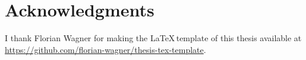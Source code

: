 \chapter*{Acknowledgments}
\setlength{\parskip}{0.68em} 
\setlength{\parindent}{0em}


I thank Florian Wagner for making the \LaTeX\,template of this thesis available at \url{https://github.com/florian-wagner/thesis-tex-template}.
\setlength{\parindent}{0pt}
\setlength{\parskip}{8pt}    

